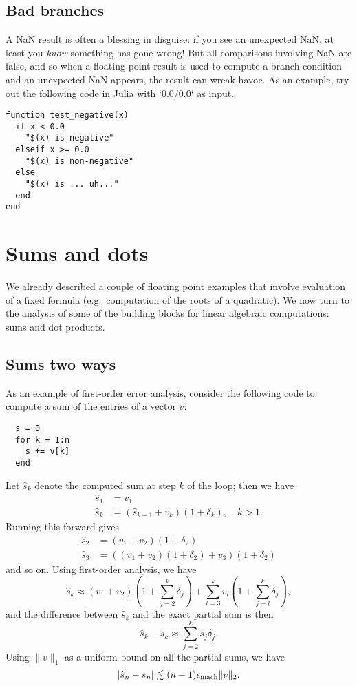 \documentclass[12pt, leqno]{article} %
\begin{document}
\subsection{Bad branches}

A NaN result is often a blessing in disguise: if you see an
unexpected NaN, at least you {\em know} something has gone wrong!
But all comparisons involving NaN are false,  and so
when a floating point result is used to compute a branch condition
and an unexpected NaN appears, the result can wreak havoc.
As an example, try out the following code in Julia with `0.0/0.0` as input.

\begin{lstlisting}
function test_negative(x)
  if x < 0.0
    "$(x) is negative"
  elseif x >= 0.0
    "$(x) is non-negative"
  else
    "$(x) is ... uh..."
  end
end\end{lstlisting}

\section{Sums and dots}

We already described a couple of floating point examples that
involve evaluation of a fixed formula (e.g.~computation of
the roots of a quadratic).  We now turn to the analysis of
some of the building blocks for linear algebraic computations:
sums and dot products.

\subsection{Sums two ways}

As an example of first-order error analysis, consider the following
code to compute a sum of the entries of a vector $v$:
\begin{lstlisting}
  s = 0
  for k = 1:n
    s += v[k]
  end
\end{lstlisting}
Let $\hat{s}_k$ denote the computed sum at step $k$ of the loop;
then we have
\begin{align*}
  \hat{s}_1 &= v_1 \\
  \hat{s}_k &= (\hat{s}_{k-1} + v_k)(1 + \delta_k), \quad k > 1.
\end{align*}
Running this forward gives
\begin{align*}
  \hat{s}_2 &= (v_1 + v_2)(1+\delta_2) \\
  \hat{s}_3 &= ((v_1 + v_2)(1+\delta_2) + v_3)(1+\delta_2)
\end{align*}
and so on.  Using first-order analysis, we have
\[
  \hat{s}_k \approx (v_1 + v_2)\left(1 + \sum_{j=2}^k \delta_j \right)
              + \sum_{l=3}^k v_l \left( 1 + \sum_{j=l}^k \delta_j \right),
\]
and the difference between $\hat{s}_k$ and the exact partial sum
is then
\[
  \hat{s}_k-s_k \approx \sum_{j=2}^k s_j \delta_j.
\]
Using $\|v\|_1$ as a uniform bound on all the partial sums, we have
\[
  |\hat{s}_n-s_n| \lesssim (n-1) \epsilon_{\mathrm{mach}} \|v\|_2.
\]
\end{document}
